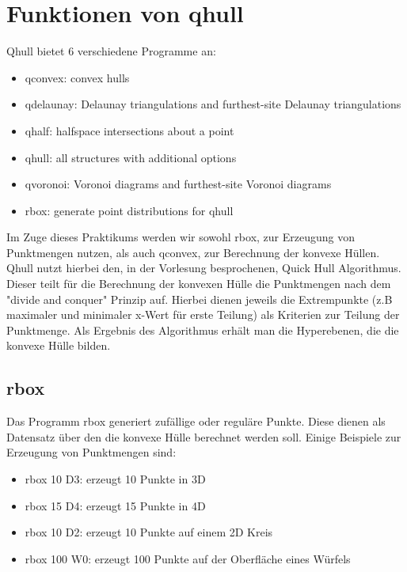 \documentclass[12pt]{scrartcl}
\begin{document}
\section{Funktionen von qhull}

Qhull bietet 6 verschiedene Programme an:
\begin{itemize}
    \setlength\itemsep{0em}
    \item qconvex: convex hulls
    \item qdelaunay: Delaunay triangulations and furthest-site Delaunay triangulations
    \item qhalf: halfspace intersections about a point
    \item qhull: all structures with additional options
    \item qvoronoi: Voronoi diagrams and furthest-site Voronoi diagrams
    \item rbox: generate point distributions for qhull
\end{itemize}

Im Zuge dieses Praktikums werden wir sowohl rbox, zur Erzeugung von Punktmengen nutzen, als auch qconvex, zur Berechnung der konvexe Hüllen.
Qhull nutzt hierbei den, in der Vorlesung besprochenen, Quick Hull Algorithmus. Dieser teilt für die Berechnung der konvexen Hülle die Punktmengen nach dem "divide and conquer" Prinzip auf. Hierbei dienen jeweils die Extrempunkte (z.B maximaler und minimaler x-Wert für erste Teilung) als Kriterien zur Teilung der Punktmenge. Als Ergebnis des Algorithmus erhält man die Hyperebenen, die die konvexe Hülle bilden.



\subsection{rbox}
Das Programm rbox generiert zufällige oder reguläre Punkte. Diese dienen als Datensatz über den die konvexe Hülle berechnet werden soll.
Einige Beispiele zur Erzeugung von Punktmengen sind:
\begin{itemize}
    \setlength\itemsep{0em}
    \item rbox 10 D3: erzeugt 10 Punkte in 3D
    \item rbox 15 D4: erzeugt 15 Punkte in 4D
    \item rbox 10 D2: erzeugt 10 Punkte auf einem 2D Kreis
    \item rbox 100 W0: erzeugt 100 Punkte  auf der Oberfläche eines Würfels
\end{itemize}
\newpage
\end{document}
